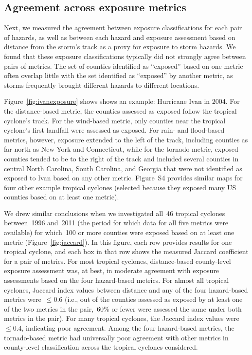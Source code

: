 \subsection*{Agreement across exposure metrics}

Next, we measured the agreement between exposure classifications for each pair
of hazards, as well as between each hazard and exposure assessment based on
distance from the storm's track as a proxy for exposure to storm hazards. We
found that these exposure classifications typically did not strongly agree
between pairs of metrics. The set of counties identified as ``exposed'' based
on one metric often overlap little with the set identified as ``exposed'' by
another metric, as storms frequently brought different hazards to different 
locations. 

Figure~\ref{fig:ivanexposure} shows shows an example: Hurricane Ivan in 2004.
For the distance-based metric, the counties assessed as exposed follow the
tropical cyclone's track. For the wind-based metric,
only counties near the tropical cyclone's first landfall were assessed as
exposed. For rain- and flood-based metrics, however, exposure extended to the
left of the track, including counties as far north as New York and Connecticut,
while for the tornado metric, exposed counties tended to be to the right of the
track and included several counties in central North Carolina, South Carolina,
and Georgia that were not identified as exposed to Ivan based on any other
metric. Figure~S4 provides similar maps for four other example tropical
cyclones (selected because they exposed many \ac{US}  counties based on at
least one metric).

We drew similar conclusions when we investigated all~46 tropical cyclones
between~1996 and~2011 (the period for which data for all five metrics were
available) for which~100 or more counties were exposed based on at least one
metric (Figure~\ref{fig:jaccard}). In this figure, each row provides results
for one tropical cyclone, and each box in that row shows the measured Jaccard
coefficient for a pair of metrics. For most tropical cyclones,
distance-based county-level exposure assessment was, at best, in moderate
agreement with exposure assessments based on the four hazard-based metrics. For
almost all tropical cyclones, Jaccard index values between distance and any of
the four hazard-based metrics were~$\le0.6$ (i.e., out of the counties assessed
as exposed by at least one of the two metrics in the pair,~60\si{\percent} or
fewer were assessed the same under both metrics in the pair). For many tropical
cyclones, the Jaccard index values were~$\le0.4$, indicating poor agreement.
Among the four hazard-based metrics, the tornado-based metric had
universally poor agreement with other metrics in county-level classification
across the tropical cyclones considered.  

